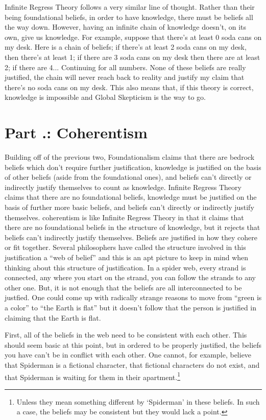 Infinite Regress Theory follows a very similar line of thought. Rather than their being foundational beliefs, in order to have knowledge, there must be beliefs all the way down.  However, having an infinite chain of knowledge doesn't, on its own, give us knowledge. For example, suppose that there's at least 0 soda cans on my desk. Here is a chain of beliefs; if there's at least 2 soda cans on my desk, then there's at least 1; if there are 3 soda cans on my desk then there are at least 2; if there are 4... Continuing for all numbers. None of these beliefs are really justified,  the chain will never reach back to reality and justify my claim that there's no soda cans on my desk. This also means that, if this theory is correct, knowledge is impossible and Global Skepticism is the way to go. 

\section{Part \thechapcount.\theseccount: Coherentism}

Building off of the previous two, Foundationalism claims that there are bedrock beliefs which don't require further justification, knowledge is justified on the basis of other beliefs (aside from the foundational ones), and beliefs can't directly or indirectly justify themselves to count as knowledge. Infinite Regress Theory claims that there are no foundational beliefs, knowledge must be justified on the basis of further more basic beliefs, and beliefs can't directly or indirectly justify themselves.  \Gls{coherentism} is like Infinite Regress Theory in that it claims that there are no foundational beliefs in the structure of knowledge, but it rejects that beliefs can't indirectly justify themselves. Beliefs are justified in how they cohere or fit together. Several philosophers have called the structure involved in this justification a ``web of belief''\autocite{Quine1} and this is an apt picture to keep in mind when thinking about this structure of justification. In a spider web, every strand is connected, any where you start on the strand, you can follow the strands to any other one. But, it is not enough that the beliefs are all interconnected to be justfied. One could come up with radically strange reasons to move from ``green is a color'' to ``the Earth is flat'' but it doesn't follow that the person is justified in claiming that the Earth is flat.  

First, all of the beliefs in the web need to be consistent with each other. This should seem basic at this point, but in ordered to be properly justified, the beliefs you have can't be in conflict with each other. One cannot, for example, believe that Spiderman is a fictional character, that fictional characters do not exist, and that Spiderman is waiting for them in their apartment.\footnote{Unless they mean something different by `Spiderman' in these beliefs. In such a case, the beliefs may be consistent but they would lack a point.} 

